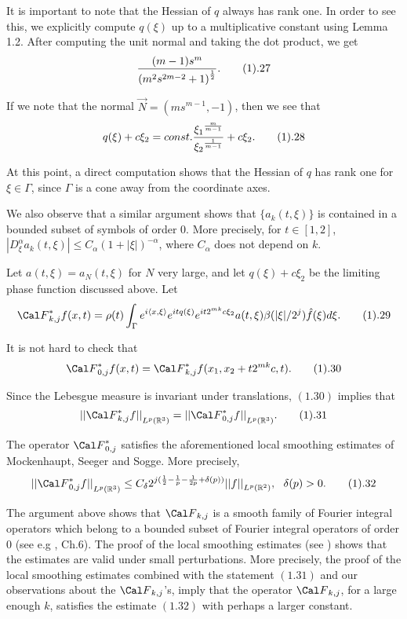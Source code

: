It is important to note that the Hessian of $q$ always has rank one.  
In order to see this, we explicitly compute $q(\xi)$ up to a 
multiplicative constant using Lemma 1.2.
After computing the unit normal and taking the dot product, we get
$$ \frac{(m-1)s^m}{{(m^2s^{2m-2}+1)}^{\frac{1}{2}}}. \tag1.27$$

If we note that the normal $\overrightarrow { N}=(ms^{m-1},-1)$, 
then we see that
$$ q(\xi)+c{\xi}_2=const.\frac{{\xi_1}^{\frac{m}{m-1}}}
{{\xi_2}^{\frac{1}{m-1}}}+
c{\xi_2}. \tag1.28$$ 

At this point, a direct computation shows that the Hessian of $q$ has rank
one for $\xi \in \Gamma$, since $\Gamma$ is a cone away from the coordinate
axes. 

We also observe that a similar argument shows that 
$\{a_k(t,\xi)\}$ is contained in a bounded subset of symbols of order $0$. 
More precisely, for $t\in [1,2]$, 
$|D^{\alpha}_{\xi}a_k(t,\xi)|\leq C_{\alpha}{(1+|\xi|)}^{-\alpha}$, where
$C_{\alpha}$ does not depend on $k$. 

Let $a(t,\xi)=a_N(t,\xi)$ for $N$ very large, and let $q(\xi)+c{\xi}_2$ be
the limiting phase function discussed above. Let
$$ {\Cal F}^{*}_{k,j}f(x,t)=\rho(t)\int_{\Gamma} e^{i\langle x,\xi \rangle}
e^{itq(\xi)} e^{it2^{mk}c{\xi}_2} a(t,\xi) \beta(|\xi|/2^{j}) \hat{f}(\xi)
d\xi. \tag1.29$$ 

It is not hard to check that 
$$ {\Cal F}^{*}_{0,j}f(x,t)={\Cal F}^{*}_{k,j}f(x_1,x_2+t2^{mk}c,t).\tag1.30$$

Since the Lebesgue measure is invariant under translations, $(1.30)$ implies
that 
$$ {||{\Cal F}^{*}_{k,j}f||}_{L^p({\Bbb R}^3)}=
{||{\Cal F}^{*}_{0,j}f||}_{L^p({\Bbb R}^3)}.\tag1.31$$ 

The operator ${\Cal F}^{*}_{0,j}$ satisfies the aforementioned local 
smoothing estimates of Mockenhaupt, Seeger and Sogge. More precisely, 
$$ {||{\Cal F}^{*}_{0,j}f||}_{L^p({\Bbb R}^3)} \leq
C_{\delta} 2^{j(\frac{1}{2}-\frac{1}{p}-\frac{1}{2p}+\delta(p))}
{||f||}_{L^p({\Bbb R}^2)}, \ \ \delta(p)>0. \tag1.32$$

The argument above shows that ${\Cal F}_{k,j}$ is a smooth family of
Fourier integral operators which belong to a bounded subset of Fourier
integral operators of order $0$ (see e.g \cite{So2}, Ch.6). 
The proof of the local smoothing estimates (see \cite{MSSo2}) shows that the 
estimates are valid under small perturbations. More precisely, the
proof of the local smoothing estimates combined with the statement $(1.31)$ 
and our observations about the ${\Cal F}_{k,j}$'s, 
imply that the operator ${\Cal F}_{k,j}$, for a large enough $k$,
satisfies the estimate $(1.32)$ with perhaps a larger constant.  

